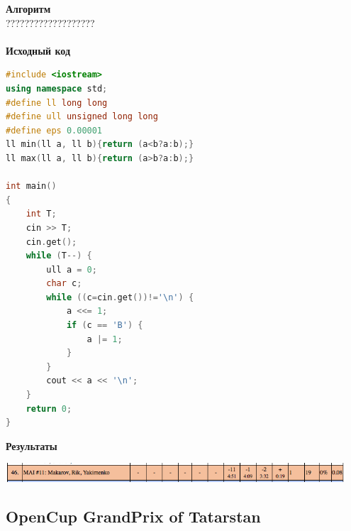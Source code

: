 \documentclass[a4paper,12pt]{article}
\begin{document}
\textbf{{\large Алгоритм}} \\
{\Huge ???????????????????} \\ 
\\
\textbf{{\large Исходный код}}
\begin{lstlisting}[language=C++]
#include <iostream>
using namespace std;
#define ll long long
#define ull unsigned long long
#define eps 0.00001
ll min(ll a, ll b){return (a<b?a:b);}
ll max(ll a, ll b){return (a>b?a:b);}

int main()
{
    int T;
    cin >> T;
    cin.get();
    while (T--) {
        ull a = 0;
        char c;
        while ((c=cin.get())!='\n') {
            a <<= 1;
            if (c == 'B') {
                a |= 1;
            }
        }
        cout << a << '\n';
    }
    return 0;
}
\end{lstlisting}

\textbf{{\large Результаты}} \\
\begin{center}
\includegraphics[width=0.95\textwidth]{OC_China/OC_China_result.png}\\ [1cm]
\end{center}



%
%
\newpage
\subsection{OpenCup GrandPrix of Tatarstan}
\end{document}
